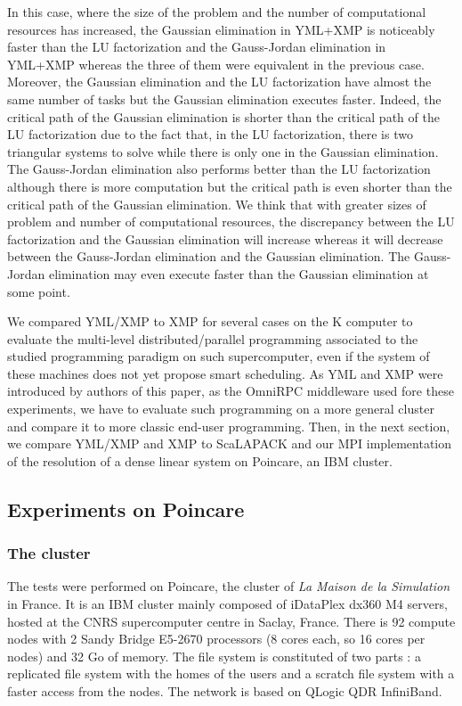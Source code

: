 In this case, where the size of the problem and the number of computational resources has increased, the Gaussian elimination in YML+XMP is noticeably faster than the LU factorization and the Gauss-Jordan elimination in YML+XMP whereas the three of them were equivalent in the previous case.
Moreover, the Gaussian elimination and the LU factorization have almost the same number of tasks but the Gaussian elimination executes faster.
Indeed, the critical path of the Gaussian elimination is shorter than the critical path of the LU factorization due to the fact that, in the LU factorization, there is two triangular systems to solve while there is only one in the Gaussian elimination.
The Gauss-Jordan elimination also performs better than the LU factorization although there is more computation but the critical path is even shorter than the critical path of the Gaussian elimination.
We think that with greater sizes of problem and number of computational resources, the discrepancy between the LU factorization and the Gaussian elimination will increase whereas it will decrease between the Gauss-Jordan elimination and the Gaussian elimination.
The Gauss-Jordan elimination may even execute faster than the Gaussian elimination at some point.


We compared YML/XMP to XMP for several cases on the K computer to evaluate the multi-level distributed/parallel programming associated to the studied programming paradigm on such supercomputer, even if the system of these machines does not yet propose smart scheduling.
As YML and XMP were introduced by authors of this paper, as the OmniRPC middleware used fore these experiments, we have to evaluate such programming on a more general cluster and compare it to more classic end-user programming.
Then, in the next section, we compare YML/XMP and XMP to ScaLAPACK and our MPI implementation of the resolution of a dense linear system on Poincare, an IBM cluster.


\subsection{Experiments on Poincare\label{sec:exp}}

\subsubsection{The cluster}
The tests were performed on Poincare, the cluster of \textit{La Maison de la Simulation} in France.
It is an IBM cluster mainly composed of iDataPlex dx360 M4 servers, hosted at the CNRS supercomputer centre in Saclay, France.
There is 92 compute nodes with 2 Sandy Bridge E5-2670 processors (8 cores each, so 16 cores per nodes) and 32 Go of memory.
The file system is constituted of two parts : a replicated file system with the homes of the users and a scratch file system with a faster access from the nodes.
The network is based on QLogic QDR InfiniBand.

